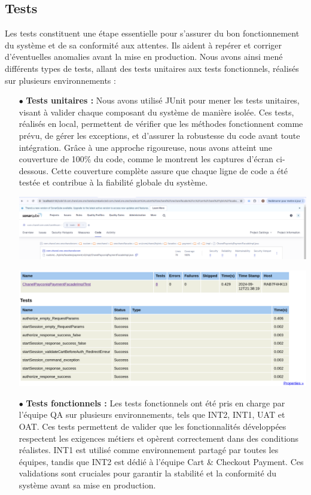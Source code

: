 \subsection{Tests}
Les tests constituent une étape essentielle pour s'assurer du bon fonctionnement du système et de sa conformité aux attentes. Ils aident à repérer et corriger d'éventuelles anomalies avant la mise en production. Nous avons ainsi mené différents types de tests, allant des tests unitaires aux tests fonctionnels, réalisés sur plusieurs environnements :
\begin{itemize}
    \item[$\bullet$] \textbf{Tests unitaires :} Nous avons utilisé JUnit pour mener les tests unitaires, visant à valider chaque composant du système de manière isolée. Ces tests, réalisés en local, permettent de vérifier que les méthodes fonctionnent comme prévu, de gérer les exceptions, et d’assurer la robustesse du code avant toute intégration. Grâce à une approche rigoureuse, nous avons atteint une couverture de 100\% du code, comme le montrent les captures d'écran ci-dessous. Cette couverture complète assure que chaque ligne de code a été testée et contribue à la fiabilité globale du système.
    \begin{center}
        \centering
        \includegraphics[width=18cm]{Figures/Screens/couvrage.png}
        \label{fig:couvrage}
    \end{center}
    \begin{center}
        \centering
        \includegraphics[width=18cm]{Figures/Screens/reportSonar.png}
        \label{fig:report}
    \end{center}
    \item[$\bullet$] \textbf{Tests fonctionnels :} Les tests fonctionnels ont été pris en charge par l'équipe QA sur plusieurs environnements, tels que INT2, INT1, UAT et OAT. Ces tests permettent de valider que les fonctionnalités développées respectent les exigences métiers et opèrent correctement dans des conditions réalistes. INT1 est utilisé comme environnement partagé par toutes les équipes, tandis que INT2 est dédié à l'équipe Cart \& Checkout Payment. Ces validations sont cruciales pour garantir la stabilité et la conformité du système avant sa mise en production.
\end{itemize}

